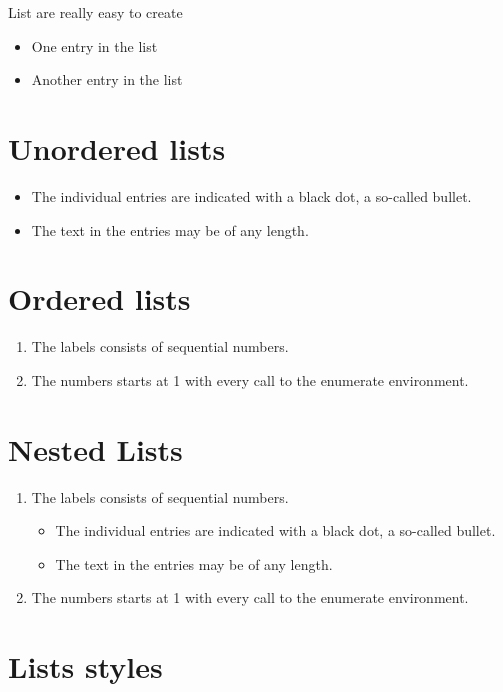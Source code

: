 \documentclass{article}
\begin{document}
List are really easy to create
 
\begin{itemize}
\item One entry in the list
\item Another entry in the list
\end{itemize}

\section{Unordered lists}

\begin{itemize}
\item The individual entries are indicated with a black dot, a so-called bullet.
\item The text in the entries may be of any length.
\end{itemize}

\section{Ordered lists}

\begin{enumerate}
\item The labels consists of sequential numbers.
\item The numbers starts at 1 with every call to the enumerate environment.
\end{enumerate}

\section{Nested Lists}

\begin{enumerate}
 \item The labels consists of sequential numbers.
 \begin{itemize}
 \item The individual entries are indicated with a black dot, a so-called bullet.
 \item The text in the entries may be of any length.
 \end{itemize}
 \item The numbers starts at 1 with every call to the enumerate environment.
\end{enumerate}

\section{Lists styles}
\end{document}
